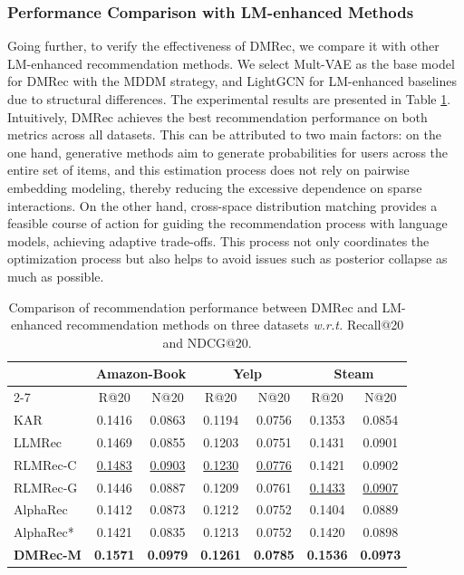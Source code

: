 \documentclass[sigconf]{acmart}
\begin{document}
\subsubsection{\textbf{Performance Comparison with LM-enhanced Methods}}
Going further, to verify the effectiveness of \textsf{DMRec}, we compare it with other LM-enhanced recommendation methods. We select Mult-VAE \cite{liang2018variational} as the base model for \textsf{DMRec} with the MDDM strategy, and LightGCN \cite{he2020lightgcn} for LM-enhanced baselines due to structural differences. The experimental results are presented in Table \ref{tab:LM}. 
Intuitively, \textsf{DMRec} achieves the best recommendation performance on both metrics across all datasets. This can be attributed to two main factors: on the one hand, generative methods aim to generate probabilities for users across the entire set of items, and this estimation process does not rely on pairwise embedding modeling, thereby reducing the excessive dependence on sparse interactions. On the other hand, cross-space distribution matching provides a feasible course of action for guiding the recommendation process with language models, achieving adaptive trade-offs. This process not only coordinates the optimization process but also helps to avoid issues such as posterior collapse as much as possible.

\begin{table}[!t]

\setlength{\abovecaptionskip}{0.1cm}
\setlength{\belowcaptionskip}{0.1cm} 
\centering
\small
  \caption{Comparison of recommendation performance between \textsf{DMRec} and LM-enhanced recommendation methods on three datasets \textit{w.r.t.} Recall@20 and NDCG@20.}
  \label{tab:LM}
  \begin{tabular}{l|cc|cc|cc}
    \hline
        &\multicolumn{2}{c|}{\textbf{Amazon-Book}}&
    \multicolumn{2}{c|}{\textbf{Yelp}}&\multicolumn{2}{c}{\textbf{Steam}}\\
	\cline{2-7}	
    &R@20&N@20&R@20&N@20&R@20&N@20\\
    \hline
    \hline
KAR&0.1416&0.0863&0.1194&0.0756&0.1353& 0.0854\\
    \hline
LLMRec&0.1469&0.0855&0.1203&0.0751&0.1431&0.0901\\
\hline
RLMRec-C&\underline{0.1483}&\underline{0.0903}&\underline{0.1230}&\underline{0.0776}&0.1421&0.0902\\
RLMRec-G&0.1446&0.0887&0.1209&0.0761&\underline{0.1433}&\underline{0.0907}\\
    \hline
AlphaRec&0.1412&0.0873&0.1212&0.0752&0.1404&0.0889\\
AlphaRec*&0.1421&0.0835&0.1213&0.0752&0.1420&0.0898\\
\hline
\hline
\textbf{\textsf{DMRec-M}}&\textbf{0.1571}&\textbf{0.0979}&\textbf{0.1261}&\textbf{0.0785}&\textbf{0.1536}&\textbf{0.0973}\\
   \hline
\end{tabular}

\end{table}
\end{document}
